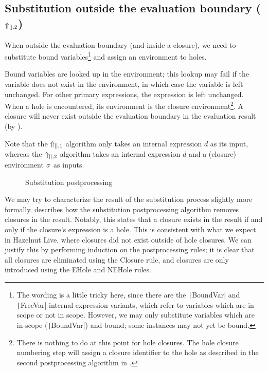 \subsection{Substitution outside the evaluation boundary ($\Uparrow_{[],2}$)}
\label{sec:postprocessing-subst-outside}

When outside the evaluation boundary (and inside a closure), we need to substitute bound variables\footnote{The wording is a little tricky here, since there are the \texttt|BoundVar| and \texttt|FreeVar| internal expression variants, which refer to variables which are in scope or not in scope. However, we may only substitute variables which are in-scope (\texttt|BoundVar|) and bound; some instances may not yet be bound.} and assign an environment to holes.

Bound variables are looked up in the environment; this lookup may fail if the variable does not exist in the environment, in which case the variable is left unchanged. For other primary expressions, the expression is left unchanged. When a hole is encountered, its environment is the closure environment\footnote{There is nothing to do at this point for hole closures. The hole closure numbering step will assign a closure identifier to the hole as described in the second postprocessing algorithm in .}. A closure will never exist outside the evaluation boundary in the evaluation result (by ).

Note that the $\Uparrow_{[],1}$ algorithm only takes an internal expression $d$ as its input, whereas the $\Uparrow_{[],2}$ algorithm takes an internal expression $d$ and a (closure) environment $\sigma$ as inputs.


\begin{figure}
  \centering
  \begin{mdframed}
    \begin{singlespace}
      
    \end{singlespace}
  \end{mdframed}
  \caption{Substitution postprocessing}
  \label{fig:big-step-inside-formal}
\end{figure}

We may try to characterize the result of the substitution process slightly more formally.  describes how the substitution postprocessing algorithm removes closures in the result. Notably, this states that a closure exists in the result if and only if the closure's expression is a hole. This is consistent with what we expect in Hazelnut Live, where closures did not exist outside of hole closures. We can justify this by performing induction on the postprocessing rules; it is clear that all closures are eliminated using the \pplcl{}Closure rule, and closures are only introduced using the \pplclo{}EHole and \pplclo{}NEHole rules.

